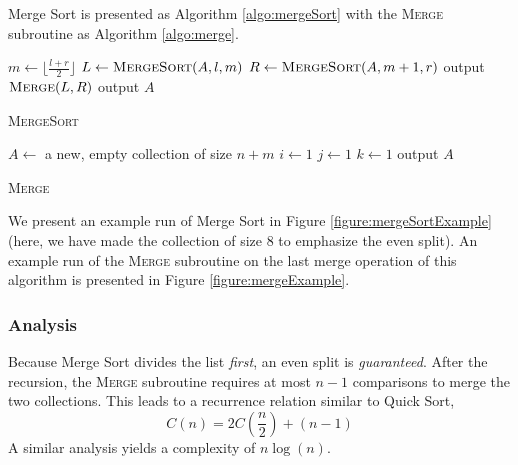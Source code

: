 Merge Sort is presented as Algorithm \ref{algo:mergeSort} with the
\textsc{Merge} subroutine as Algorithm \ref{algo:merge}.

\begin{algorithm}
   {
    $m \leftarrow \lfloor\frac{l+r}{2}\rfloor$ \;
    $L \leftarrow \textsc{MergeSort}(A, l, m)$ \;
    $R \leftarrow \textsc{MergeSort}(A, m+1, r)$ \;
    output $\textsc{Merge}(L, R)$ \;    
  }{
    output $A$ \;
  }
\caption{\textsc{MergeSort}}
\label{algo:mergeSort}
\end{algorithm}

\begin{algorithm}[H]
  $A \leftarrow $ a new, empty collection of size $n+m$ \;
  $i \leftarrow 1$ 
  $j \leftarrow 1$ 
  $k \leftarrow 1$ 
  output $A$ \;
\caption{\textsc{Merge}}
\label{algo:merge}
\end{algorithm}

We present an example run of Merge Sort in Figure \ref{figure:mergeSortExample}
(here, we have made the collection of size 8 to emphasize the even split).  
An example run of the \textsc{Merge} subroutine on the last merge operation
of this algorithm is presented in Figure \ref{figure:mergeExample}.



\subsubsection{Analysis}

Because Merge Sort divides the list \emph{first}, an even split is
\emph{guaranteed}.  After the recursion, the \textsc{Merge} subroutine
requires at most $n-1$ comparisons to merge the two collections.  This
leads to a recurrence relation similar to Quick Sort, 
  $$C(n) = 2C\left( \frac{n}{2} \right) + (n-1)$$
A similar analysis yields a complexity of $n \log{(n)}$.

